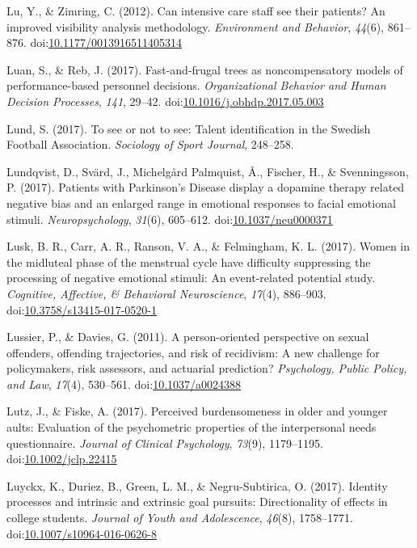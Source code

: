\documentclass[english,man]{apa6}
\theoremstyle{definition}
\theoremstyle{definition}
\theoremstyle{definition}
\theoremstyle{remark}
\begin{document}
\hypertarget{ref-Lu2012}{}
Lu, Y., \& Zimring, C. (2012). Can intensive care staff see their
patients? An improved visibility analysis methodology. \emph{Environment
and Behavior}, \emph{44}(6), 861--876.
doi:\href{https://doi.org/10.1177/0013916511405314}{10.1177/0013916511405314}

\hypertarget{ref-Luan2017}{}
Luan, S., \& Reb, J. (2017). Fast-and-frugal trees as noncompensatory
models of performance-based personnel decisions. \emph{Organizational
Behavior and Human Decision Processes}, \emph{141}, 29--42.
doi:\href{https://doi.org/10.1016/j.obhdp.2017.05.003}{10.1016/j.obhdp.2017.05.003}

\hypertarget{ref-Lund2017}{}
Lund, S. (2017). To see or not to see: Talent identification in the
Swedish Football Association. \emph{Sociology of Sport Journal},
248--258.

\hypertarget{ref-Lundqvist2017}{}
Lundqvist, D., Svärd, J., Michelgård Palmquist, Å., Fischer, H., \&
Svenningsson, P. (2017). Patients with Parkinson's Disease display a
dopamine therapy related negative bias and an enlarged range in
emotional responses to facial emotional stimuli. \emph{Neuropsychology},
\emph{31}(6), 605--612.
doi:\href{https://doi.org/10.1037/neu0000371}{10.1037/neu0000371}

\hypertarget{ref-Lusk2017}{}
Lusk, B. R., Carr, A. R., Ranson, V. A., \& Felmingham, K. L. (2017).
Women in the midluteal phase of the menstrual cycle have difficulty
suppressing the processing of negative emotional stimuli: An
event-related potential study. \emph{Cognitive, Affective, \& Behavioral
Neuroscience}, \emph{17}(4), 886--903.
doi:\href{https://doi.org/10.3758/s13415-017-0520-1}{10.3758/s13415-017-0520-1}

\hypertarget{ref-Lussier2011}{}
Lussier, P., \& Davies, G. (2011). A person-oriented perspective on
sexual offenders, offending trajectories, and risk of recidivism: A new
challenge for policymakers, risk assessors, and actuarial prediction?
\emph{Psychology, Public Policy, and Law}, \emph{17}(4), 530--561.
doi:\href{https://doi.org/10.1037/a0024388}{10.1037/a0024388}

\hypertarget{ref-Lutz2017}{}
Lutz, J., \& Fiske, A. (2017). Perceived burdensomeness in older and
younger aults: Evaluation of the psychometric properties of the
interpersonal needs questionnaire. \emph{Journal of Clinical
Psychology}, \emph{73}(9), 1179--1195.
doi:\href{https://doi.org/10.1002/jclp.22415}{10.1002/jclp.22415}

\hypertarget{ref-Luyckx2017}{}
Luyckx, K., Duriez, B., Green, L. M., \& Negru-Subtirica, O. (2017).
Identity processes and intrinsic and extrinsic goal pursuits:
Directionality of effects in college students. \emph{Journal of Youth
and Adolescence}, \emph{46}(8), 1758--1771.
doi:\href{https://doi.org/10.1007/s10964-016-0626-8}{10.1007/s10964-016-0626-8}
\end{document}
